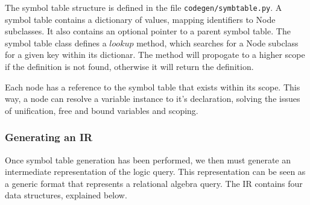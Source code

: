 \documentclass[a4paper, 11pt]{article}
\begin{document}
      The symbol table structure is defined in the file
      \texttt{codegen/symbtable.py}. A symbol table contains a dictionary of
      values, mapping identifiers to Node subclasses. It also contains an
      optional pointer to a parent symbol table. The symbol table class defines
      a $lookup$ method, which searches for a Node subclass for a given key
      within its dictionar. The method will propogate to a higher scope if the
      definition is not found, otherwise it will return the definition.

      Each node has a reference to the symbol table that exists within its
      scope. This way, a node can resolve a variable instance to it's
      declaration, solving the issues of unification, free and bound variables
      and scoping.

    \subsubsection{Generating an IR}

      Once symbol table generation has been performed, we then must generate an
      intermediate representation of the logic query. This representation can
      be seen as a generic format that represents a relational algebra
      query. The IR contains four data structures, explained below.
\end{document}
